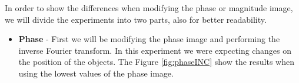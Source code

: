\documentclass[12pt,a4paper]{article}
\begin{document}
In order to show the differences when modifying the phase or magnitude image, we will divide the experiments into two parts, also for better readability. \\

\begin{itemize}
	\item \textbf{Phase} - First we will be modifying the phase image and performing the inverse Fourier transform. In this experiment we were expecting changes on the position of the objects. The Figure \ref{fig:phaseINC} show the results when using the lowest values of the phase image. \\

	\begin{figure}[!h]
		\centering
		\quad
\end{figure}
\end{itemize}
\end{document}
